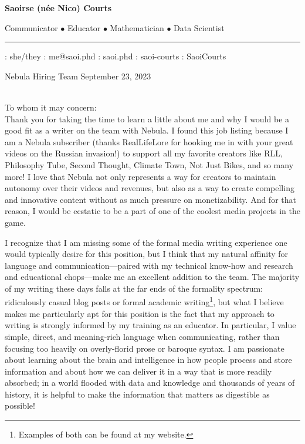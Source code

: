 \documentclass[12pt]{article} %
\begin{document}
\thispagestyle{empty}

\centerline{\large\bf Saoirse (née Nico) Courts} %
\centerline{ Communicator $\bullet$ Educator $\bullet$ Mathematician $\bullet$ Data Scientist} %
\medskip\hrule\smallskip

\centerline{\faTransgenderAlt: she/they\hspace{0.3in} \faEnvelope: me@saoi.phd \hspace{0.3in} \faChain: saoi.phd \hspace{0.3in}\faLinkedinSquare: saoi-courts \hspace{0.3in}\faGithubAlt: SaoiCourts}

\vspace{0.3in}

\noindent Nebula Hiring Team \hfill September 23, 2023\\
\\\vspace{0.2in}

\noindent To whom it may concern:\hfill\\

Thank you for taking the time to learn a little about me and why I would be a good fit as a writer on the team with Nebula.
I found this job listing because I am a Nebula subscriber (thanks RealLifeLore for hooking me in with your great videos on the Russian invasion!) to support all my favorite creators like RLL, Philosophy Tube, Second Thought, Climate Town, Not Just Bikes, and so many more!
I love that Nebula not only represents a way for creators to maintain autonomy over their videos and revenues, but also as a way to create compelling and innovative content without as much pressure on monetizability.
And for that reason, I would be ecstatic to be a part of one of the coolest media projects in the game.

I recognize that I am missing some of the formal media writing experience one would typically desire for this position, but I think that my natural affinity for language and communication---paired with my technical know-how and research and educational chops---make me an excellent addition to the team.
The majority of my writing these days falls at the far ends of the formality spectrum: ridiculously casual blog posts or formal academic writing\footnote{Examples of both can be found at my website.}, but what I believe makes me particularly apt for this position is the fact that my approach to writing is strongly informed by my training as an educator.
In particular, I value simple, direct, and meaning-rich language when communicating, rather than focusing too heavily on overly-florid prose or baroque syntax.
I am passionate about learning about the brain and intelligence in how people process and store information and about how we can deliver it in a way that is more readily absorbed; in a world flooded with data and knowledge and thousands of years of history, it is helpful to make the information that matters as digestible as possible!
\end{document}
